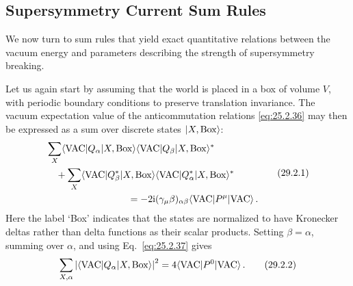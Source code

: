 
\subsection{Supersymmetry Current Sum Rules}

We now turn to sum rules that yield exact quantitative relations between
the vacuum energy and parameters describing the strength of supersymmetry
breaking.

Let us again start by assuming that the world is placed in a box of volume
\(V\), with periodic boundary conditions to preserve translation
invariance. The vacuum expectation value of the anticommutation relations
\eqref{eq:25.2.36} may then be expressed as a sum over discrete states
\(\lvert X,\mathrm{Box}\rangle\):
\begin{equation}
  \begin{aligned}
  &\sum_X
    \bra{\mathrm{VAC}} Q_\alpha\ket{X,\mathrm{Box}}
    \bra{\mathrm{VAC}} Q_\beta\ket{X,\mathrm{Box}}^*
  \\
  &\quad
  +\sum_X
    \bra{\mathrm{VAC}} Q_\beta^*\ket{X,\mathrm{Box}}
    \bra{\mathrm{VAC}} Q_\alpha^*\ket{X,\mathrm{Box}}^*
  \\
  &\hspace{30mm}
  =-2\ii(\gamma_\mu\beta)_{\alpha\beta}
    \bra{\mathrm{VAC}} P^\mu\ket{\mathrm{VAC}}\,.
  \end{aligned}
  \tag{29.2.1}\label{eq:29.2.1}
\end{equation}
Here the label `Box' indicates that the states are normalized to have
Kronecker deltas rather than delta functions as their scalar products.
Setting \(\beta=\alpha\), summing over \(\alpha\), and using
Eq.~\eqref{eq:25.2.37} gives
\begin{equation}
  \sum_{X,\alpha}
  \left\lvert
    \langle \mathrm{VAC}\rvert Q_\alpha\lvert X,\mathrm{Box}\rangle
  \right\rvert^2
  =4\langle \mathrm{VAC}\rvert P^0\lvert \mathrm{VAC}\rangle\,.
  \tag{29.2.2}\label{eq:29.2.2}
\end{equation}

